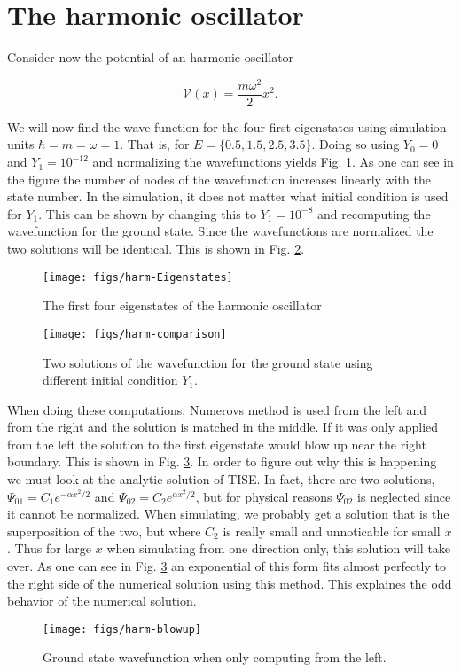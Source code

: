 \section{The harmonic oscillator}

Consider now the potential of an harmonic oscillator

\begin{equation}
  \label{eq:harm}
  \mathcal V(x) = \frac{m \omega^2}{2}x^2.
\end{equation}

We will now find the wave function for the four first eigenstates using simulation units $\hbar = m = \omega = 1$. That is, for $E= \{0.5,1.5,2.5,3.5\}$. Doing so using $Y_0 = 0$ and $Y_1 = 10^{-12}$ and normalizing the wavefunctions yields Fig. \ref{fig:harm-Eigenstates}. As one can see in the figure the number of nodes of the wavefunction increases linearly with the state number. In the simulation, it does not matter what initial condition is used for $Y_1$. This can be shown by changing this to $Y_1 = 10^{-8}$ and recomputing the wavefunction for the ground state. Since the wavefunctions are normalized the two solutions will be identical. This is shown in Fig. \ref{fig:harm-comp}.

\begin{figure}[h]
  \centering
  \texttt{[image: figs/harm-Eigenstates]}
  \caption{The first four eigenstates of the harmonic oscillator}
  \label{fig:harm-Eigenstates}
\end{figure}

\begin{figure}[h]
  \centering
  \texttt{[image: figs/harm-comparison]}
  \caption{Two solutions of the wavefunction for the ground state using different initial condition $Y_1$.}
  \label{fig:harm-comp}
\end{figure}

When doing these computations, Numerovs method is used from the left and from the right and the solution is matched in the middle. If it was only applied from the left the solution to the first eigenstate would blow up near the right boundary. This is shown in Fig. \ref{fig:harm-blowup}. In order to figure out why this is happening we must look at the analytic solution of TISE. In fact, there are two solutions, $\Psi_{01} = C_1 e^{-\alpha x^2 /2}$ and $\Psi_{02} = C_2 e^{\alpha x^2 /2}$, but for physical reasons $\Psi_{02}$ is neglected since it cannot be normalized. When simulating, we probably get a solution that is the superposition of the two, but where $C_2$ is really small and unnoticable for small $x$. Thus for large $x$ when simulating from one direction only, this solution will take over. As one can see in Fig. \ref{fig:harm-blowup} an exponential of this form fits almost perfectly to the right side of the numerical solution using this method. This explaines the odd behavior of the numerical solution.

\begin{figure}[h]
  \centering
  \texttt{[image: figs/harm-blowup]}
  \caption{Ground state wavefunction when only computing from the left.}
  \label{fig:harm-blowup}
\end{figure}

\clearpage
